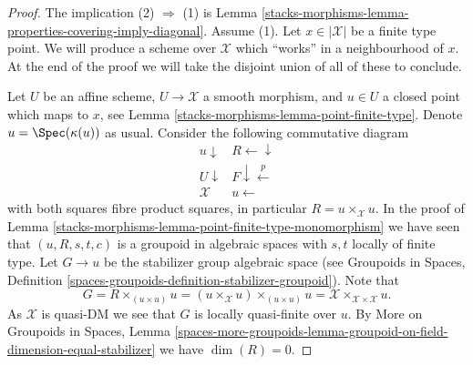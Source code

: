 \begin{proof}
The implication (2) $\Rightarrow$ (1) is
Lemma \ref{stacks-morphisms-lemma-properties-covering-imply-diagonal}.
Assume (1).
Let $x \in |\mathcal{X}|$ be a finite type point. We will produce a scheme
over $\mathcal{X}$ which ``works'' in a neighbourhood of $x$. At the end
of the proof we will take the disjoint union of all of these to conclude.

\medskip\noindent
Let $U$ be an affine scheme, $U \to \mathcal{X}$ a smooth morphism, and
$u \in U$ a closed point which maps to $x$, see
Lemma \ref{stacks-morphisms-lemma-point-finite-type}.
Denote $u = \Spec(\kappa(u))$ as usual. Consider the following
commutative diagram
$$
\begin{array}{cc}u \downarrow & R \longleftarrow\downarrow \\ U \downarrow & F \downarrow\overset{p}{\longleftarrow} \\ \mathcal{X} & u \longleftarrow\end{array}
$$
with both squares fibre product squares, in particular
$R = u \times_\mathcal{X} u$. In the proof of
Lemma \ref{stacks-morphisms-lemma-point-finite-type-monomorphism}
we have seen that $(u, R, s, t, c)$ is a groupoid in algebraic spaces
with $s, t$ locally of finite type. Let $G \to u$ be the stabilizer group
algebraic space (see
Groupoids in Spaces, Definition
\ref{spaces-groupoids-definition-stabilizer-groupoid}).
Note that
$$
G = R \times_{(u \times u)} u =
(u \times_\mathcal{X} u) \times_{(u \times u)} u =
\mathcal{X} \times_{\mathcal{X} \times \mathcal{X}} u.
$$
As $\mathcal{X}$ is quasi-DM we see that
$G$ is locally quasi-finite over $u$. By
More on Groupoids in Spaces, Lemma
\ref{spaces-more-groupoids-lemma-groupoid-on-field-dimension-equal-stabilizer}
we have $\dim(R) = 0$.


\end{proof}
